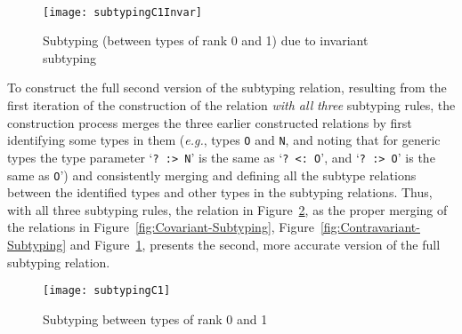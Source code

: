 \documentclass[twocolumn,english]{article}
\numberwithin{equation}{section}
\numberwithin{figure}{section}
\newcommand{\code}[1]{\texttt{#1}}
\begin{document}
\begin{figure}
\noindent \begin{centering}
~~~
\par\end{centering}

\protect\caption{}
\end{figure}


\begin{figure}
\texttt{[image: subtypingC1Invar]}

\protect\caption{\label{fig:Invariant-Subtyping}Subtyping (between types of rank 0
and 1) due to invariant subtyping}
\end{figure}
To construct the full second version of the subtyping relation, resulting
from the first iteration of the construction of the relation \emph{with
all} \emph{three }subtyping rules, the construction process merges
the three earlier constructed relations by first identifying some
types in them (\emph{e.g.}, types \code{O} and \code{N}, and noting
that for generic types the type parameter `\code{?~:>~N}' is the
same as `\code{?~<:~O}', and `\code{?~:>~O}' is the same as
\code{O}') and consistently merging and defining all the subtype
relations between the identified types and other types in the subtyping
relations. Thus, with all three subtyping rules, the relation in Figure~\ref{fig:Subtyping-rank-1},
as the proper merging of the relations in Figure~\ref{fig:Covariant-Subtyping},
Figure~\ref{fig:Contravariant-Subtyping} and Figure~\ref{fig:Invariant-Subtyping},
presents the second, more accurate version of the full subtyping relation.

\begin{figure}
\noindent \begin{centering}
\texttt{[image: subtypingC1]}
\par\end{centering}

\protect\caption{\label{fig:Subtyping-rank-1}Subtyping between types of rank 0 and
1}
\end{figure}
\end{document}
